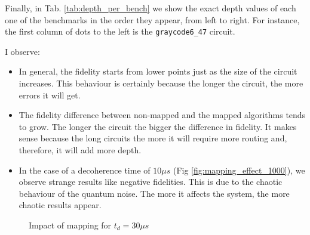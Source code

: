 Finally, in Tab. \ref{tab:depth_per_bench} we show the exact depth values of each one of the benchmarks in the order they appear, from left to right.
For instance, the first column of dots to the left is the \texttt{graycode6\_47} circuit.


I observe:

\begin{itemize}
\item In general, the fidelity starts from lower points just as the size of the circuit increases. This behaviour is certainly because the longer the circuit, the more errors it will get.
\item The fidelity difference between non-mapped and the mapped algorithms tends to grow. The longer the circuit the bigger the difference in fidelity. It makes sense because the long circuits the more it will require more routing and, therefore, it will add more depth.
\item In the case of a decoherence time of \(10 \mu s\) (Fig \ref{fig:mapping_effect_1000}), we observe strange results like negative fidelities. This is due to the chaotic behaviour of the quantum noise. The more it affects the system, the more chaotic results appear.
\end{itemize}


\begin{figure}
\centering
{}


\caption{Impact of mapping for $t_d = 30 \mu s$}
\label{fig:mapping_effect_3000}
\end{figure}


